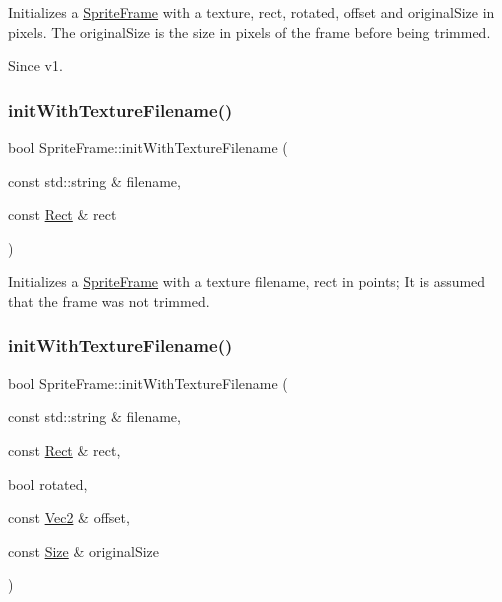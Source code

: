 Initializes a \hyperlink{classSpriteFrame}{Sprite\+Frame} with a texture, rect, rotated, offset and original\+Size in pixels. The original\+Size is the size in pixels of the frame before being trimmed.

\begin{DoxySince}{Since}
v1. 
\end{DoxySince}
\mbox{\label{classSpriteFrame_a148345ef7f3bb972f829c8345d8eafe6}} 
\subsubsection{\texorpdfstring{init\+With\+Texture\+Filename()}{initWithTextureFilename()}\hspace{0.1cm}{\footnotesize\ttfamily [3/4]}}
{\footnotesize\ttfamily bool Sprite\+Frame\+::init\+With\+Texture\+Filename (\begin{DoxyParamCaption}\item[{const std\+::string \&}]{filename,  }\item[{const \hyperlink{classRect}{Rect} \&}]{rect }\end{DoxyParamCaption})}

Initializes a \hyperlink{classSpriteFrame}{Sprite\+Frame} with a texture filename, rect in points; It is assumed that the frame was not trimmed. \mbox{\label{classSpriteFrame_ad1b6afd243eadab8a2f2128561645133}} 
\subsubsection{\texorpdfstring{init\+With\+Texture\+Filename()}{initWithTextureFilename()}\hspace{0.1cm}{\footnotesize\ttfamily [4/4]}}
{\footnotesize\ttfamily bool Sprite\+Frame\+::init\+With\+Texture\+Filename (\begin{DoxyParamCaption}\item[{const std\+::string \&}]{filename,  }\item[{const \hyperlink{classRect}{Rect} \&}]{rect,  }\item[{bool}]{rotated,  }\item[{const \hyperlink{classVec2}{Vec2} \&}]{offset,  }\item[{const \hyperlink{classSize}{Size} \&}]{original\+Size }\end{DoxyParamCaption})}

